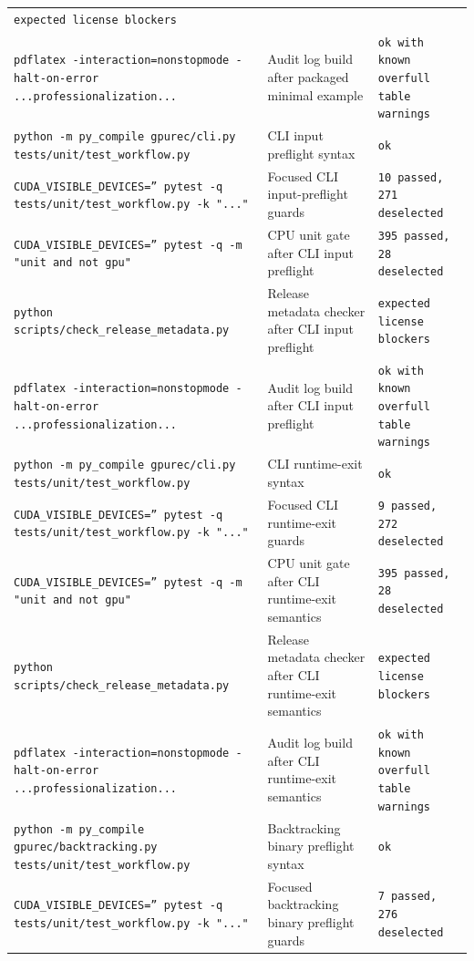 \documentclass[11pt]{article}
\begin{document}
\begin{center}
\begin{tabular}{lll}
\texttt{expected license blockers} \\
\texttt{pdflatex -interaction=nonstopmode -halt-on-error ...professionalization...} &
Audit log build after packaged minimal example &
\texttt{ok with known overfull table warnings} \\
\texttt{python -m py\_compile gpurec/cli.py tests/unit/test\_workflow.py} &
CLI input preflight syntax &
\texttt{ok} \\
\texttt{CUDA\_VISIBLE\_DEVICES='' pytest -q tests/unit/test\_workflow.py -k "..."} &
Focused CLI input-preflight guards &
\texttt{10 passed, 271 deselected} \\
\texttt{CUDA\_VISIBLE\_DEVICES='' pytest -q -m "unit and not gpu"} &
CPU unit gate after CLI input preflight &
\texttt{395 passed, 28 deselected} \\
\texttt{python scripts/check\_release\_metadata.py} &
Release metadata checker after CLI input preflight &
\texttt{expected license blockers} \\
\texttt{pdflatex -interaction=nonstopmode -halt-on-error ...professionalization...} &
Audit log build after CLI input preflight &
\texttt{ok with known overfull table warnings} \\
\texttt{python -m py\_compile gpurec/cli.py tests/unit/test\_workflow.py} &
CLI runtime-exit syntax &
\texttt{ok} \\
\texttt{CUDA\_VISIBLE\_DEVICES='' pytest -q tests/unit/test\_workflow.py -k "..."} &
Focused CLI runtime-exit guards &
\texttt{9 passed, 272 deselected} \\
\texttt{CUDA\_VISIBLE\_DEVICES='' pytest -q -m "unit and not gpu"} &
CPU unit gate after CLI runtime-exit semantics &
\texttt{395 passed, 28 deselected} \\
\texttt{python scripts/check\_release\_metadata.py} &
Release metadata checker after CLI runtime-exit semantics &
\texttt{expected license blockers} \\
\texttt{pdflatex -interaction=nonstopmode -halt-on-error ...professionalization...} &
Audit log build after CLI runtime-exit semantics &
\texttt{ok with known overfull table warnings} \\
\texttt{python -m py\_compile gpurec/backtracking.py tests/unit/test\_workflow.py} &
Backtracking binary preflight syntax &
\texttt{ok} \\
\texttt{CUDA\_VISIBLE\_DEVICES='' pytest -q tests/unit/test\_workflow.py -k "..."} &
Focused backtracking binary preflight guards &
\texttt{7 passed, 276 deselected} \\

\end{tabular}
\end{center}
\end{document}

